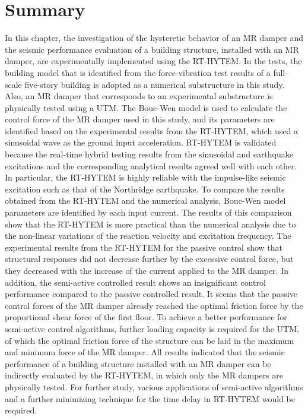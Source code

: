 \section{Summary}
In this chapter, the investigation of the hysteretic behavior of an MR damper and the seismic performance evaluation of a building structure, installed with an MR damper, are experimentally implemented using the RT-HYTEM. In the tests, the building model that is identified from the force-vibration test results of a full-scale five-story building is adopted as a numerical substructure in this study. Also, an MR damper that corresponds to an experimental substructure is physically tested using a UTM. The Bouc-Wen model is used to calculate the control force of the MR damper used in this study, and its parameters are identified based on the experimental results from the RT-HYTEM, which used a sinusoidal wave as the ground input acceleration. RT-HYTEM is validated because the real-time hybrid testing results from the sinusoidal and earthquake excitations and the corresponding analytical results agreed well with each other. In particular, the RT-HYTEM is highly reliable with the impulse-like seismic excitation such as that of the Northridge earthquake. To compare the results obtained from the RT-HYTEM and the numerical analysis, Bouc-Wen model parameters are identified by each input current. The results of this comparison show that the RT-HYTEM is more practical than the numerical analysis due to the non-linear variations of the reaction velocity and excitation frequency. The experimental results from the RT-HYTEM for the passive control show that structural responses did not decrease further by the excessive control force, but they decreased with the increase of the current applied to the MR damper. In addition, the semi-active controlled result shows an insignificant control performance compared to the passive controlled result. It seems that the passive control forces of the MR damper already reached the optimal friction force by the proportional shear force of the first floor. To achieve a better performance for semi-active control algorithms, further loading capacity is required for the UTM, of which the optimal friction force of the structure can be laid in the maximum and minimum force of the MR damper. All results indicated that the seismic performance of a building structure installed with an MR damper can be indirectly evaluated by the RT-HYTEM, in which only the MR dampers are physically tested. For further study, various applications of semi-active algorithms and a further minimizing technique for the time delay in RT-HYTEM would be required.